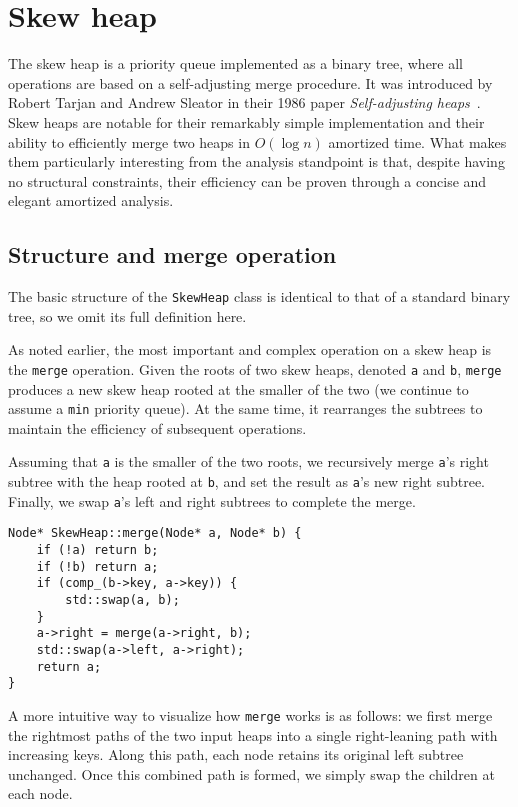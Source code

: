 \section{Skew heap}

The skew heap is a priority queue implemented as a binary tree, where all operations are based on a self-adjusting merge procedure. It was introduced by Robert Tarjan and Andrew Sleator in their 1986 paper \emph{Self-adjusting heaps}~\cite{SleatorTarjan1986}. Skew heaps are notable for their remarkably simple implementation and their ability to efficiently merge two heaps in \( O(\log n) \) amortized time. What makes them particularly interesting from the analysis standpoint is that, despite having no structural constraints, their efficiency can be proven through a concise and elegant amortized analysis.

\subsection{Structure and merge operation}

The basic structure of the \texttt{SkewHeap} class is identical to that of a standard binary tree, so we omit its full definition here.

As noted earlier, the most important and complex operation on a skew heap is the \texttt{merge} operation. Given the roots of two skew heaps, denoted \texttt{a} and \texttt{b}, \texttt{merge} produces a new skew heap rooted at the smaller of the two (we continue to assume a \texttt{min} priority queue). At the same time, it rearranges the subtrees to maintain the efficiency of subsequent operations.

Assuming that \texttt{a} is the smaller of the two roots, we recursively merge \texttt{a}'s right subtree with the heap rooted at \texttt{b}, and set the result as \texttt{a}'s new right subtree. Finally, we swap \texttt{a}'s left and right subtrees to complete the merge.

\begin{verbatim}
Node* SkewHeap::merge(Node* a, Node* b) {
    if (!a) return b;
    if (!b) return a;
    if (comp_(b->key, a->key)) {
        std::swap(a, b);
    }
    a->right = merge(a->right, b);
    std::swap(a->left, a->right);
    return a;
}
\end{verbatim}

A more intuitive way to visualize how \texttt{merge} works is as follows: we first merge the rightmost paths of the two input heaps into a single right-leaning path with increasing keys. Along this path, each node retains its original left subtree unchanged. Once this combined path is formed, we simply swap the children at each node.

